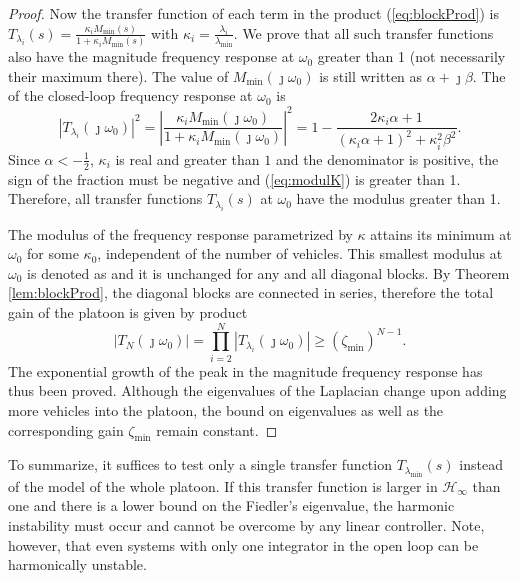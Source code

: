 \documentclass[technote, 10pt, twoside]{IEEEtran}
\newcommand{\lapDom}{s}
\newcommand{\openLoop}{M}
\newcommand{\openLoopGain}{\openLoop_{\min}}
\newcommand{\wn}{i}
\newcommand{\numVeh}{N}
\newcommand{\spatEig}{\lambda} \newcommand{\spatEigWn}{\lambda_\wn}
\newcommand{\spatEigMin}{\spatEig_{\min}}
\newcommand{\diagTransBlockEig}{T}
\newcommand{\diagTransBlockEigWn}{\diagTransBlockEig_{\spatEigWn}}
\newcommand{\diagTransBlockEigMin}{\diagTransBlockEig_{\spatEig_{\min}}}
\newcommand{\diagTransBlockN}{\diagTransBlockEig_{\numVeh}}
\theoremstyle{plain}
\theoremstyle{definition}
\theoremstyle{assump}
\begin{document}
\begin{proof}
Now the transfer function of each term in the product (\ref{eq:blockProd}) is
$\diagTransBlockEigWn(\lapDom) = \frac{\kappa_\wn
\openLoopGain(\lapDom)}{1+\kappa_\wn \openLoopGain(\lapDom)}$ with
$\kappa_\wn=\frac{\spatEigWn}{\spatEigMin}$. We prove that all such
transfer functions also have the magnitude frequency response at $\omega_0$
greater than 1 (not necessarily their maximum there). The value of
$\openLoopGain(\jmath \omega_0)$ is still written as $\alpha+\jmath \beta$. The
 of the closed-loop frequency response
at $\omega_0$ is
\begin{equation}
	|\diagTransBlockEigWn(\jmath \omega_0)|^2 = \left |
\frac{\kappa_\wn {\openLoopGain}(\jmath \omega_0)}{1+\kappa_\wn
\openLoopGain(\jmath \omega_0)} \right |^2=1- \frac{2 \kappa_\wn
\alpha+1}{(\kappa_\wn \alpha+1)^2 +\kappa_\wn^2 \beta^2}. \label{eq:modulK}
\end{equation}
Since $\alpha < -\frac{1}{2}$, $\kappa_\wn$  is real and greater than $1$ and
the denominator is positive, the sign of the fraction must be negative and
(\ref{eq:modulK}) is greater than 1. Therefore, all transfer functions
$\diagTransBlockEigWn(\lapDom)$ at $\omega_0$ have the modulus greater than 1.
	
The modulus of the frequency response parametrized by $\kappa$ attains its
minimum at $\omega_0$ for some $\kappa_0$, independent of the number of
vehicles. This smallest modulus at $\omega_0$ is denoted as
 and it is unchanged for any and all diagonal blocks. By Theorem
\ref{lem:blockProd}, the diagonal blocks are connected in series, therefore the
total gain of the platoon is given by product
\begin{equation}
|\diagTransBlockN (\jmath \omega_0)| =
\prod_{i=2}^{\numVeh}|\diagTransBlockEigWn(\jmath \omega_0)| \geq
(\zeta_{\min})^{N-1}.
\end{equation}
The exponential growth of the peak in the magnitude frequency response has thus
been proved. Although the eigenvalues of the Laplacian change upon adding more
vehicles into the platoon, the bound on eigenvalues as well as the corresponding
gain $\zeta_{\min}$ remain constant.
\end{proof} 

To summarize, it suffices to test only a single transfer function
$\diagTransBlockEigMin(s)$ instead of the model of the whole platoon. If this
transfer function is larger in $\mathcal{H}_\infty$ than one and there is a
lower bound on the Fiedler's eigenvalue, the harmonic instability must occur and
cannot be overcome by any linear controller. Note, however, that even systems
with only one integrator in the open loop can be harmonically unstable.
\end{document}
